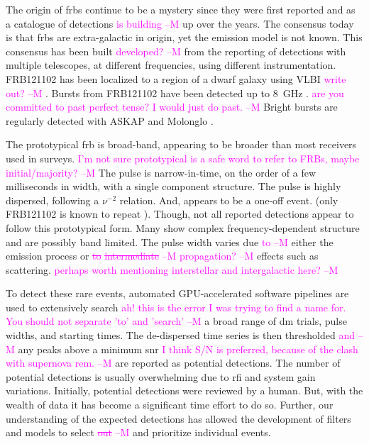 \documentclass[a4paper,fleqn,usenatbib]{mnras}
\newcommand{\cM}[1]{\textcolor{magenta}{ #1 --M}}
\begin{document}
The origin of \glspl{frb} continue to be a mystery since they were first
reported \citep{2007Sci...318..777L} and as a catalogue of detections \cM{is
building} up over the years.  The consensus today is that \glspl{frb} are
extra-galactic in origin, yet the emission model is not known.  This consensus
has been built \cM{developed?} from the reporting of detections with multiple telescopes, at
different frequencies, using different instrumentation.  FRB121102 has been
localized to a region of a dwarf galaxy using VLBI \cM{write out?}
\citep{2017ApJ...834L...7T,2017Natur.541...58C}.  Bursts from FRB121102 have
been detected up to 8~GHz \citep{atel10675}. \cM{are you committed to past perfect tense? I would just do past.} Bright bursts are regularly
detected with ASKAP and Molonglo
\citep{2017ApJ...841L..12B,2017MNRAS.468.3746C,atel10693}.

The prototypical \gls{frb} is broad-band, appearing to be broader than most
receivers used in surveys. \cM{I'm not sure prototypical is a safe word to refer to FRBs, maybe initial/majority?} The pulse is narrow-in-time, on the order of a few
milliseconds in width, with a single component structure. The pulse is highly
dispersed, following a $\nu^{-2}$ relation. And, appears to be a one-off event.
(only FRB121102 is known to repeat \citep{2016Natur.531..202S}).  Though, not
all reported detections appear to follow this prototypical form. Many show
complex frequency-dependent structure and are possibly band limited. The pulse
width varies due \cM{to} either the emission process or \cM{\sout{to} \sout{intermediate}} \cM{propagation?} effects such as
scattering. \cM{perhaps worth mentioning interstellar and intergalactic here?}

To detect these rare events, automated GPU-accelerated software pipelines are
used to extensively search \cM{ah! this is the error I was trying to find a name for. You should not separate 'to' and 'search'} a broad range of \gls{dm} trials, pulse widths, and
starting times. The de-dispersed time series is then thresholded \cM{and} any peaks
above a minimum \gls{snr} \cM{I think S/N is preferred, because of the clash with supernova rem.} are reported as potential detections. The number of
potential detections is usually overwhelming due to \gls{rfi} and system gain
variations. Initially, potential detections were reviewed by a human. But, with
the wealth of data it has become a significant time effort to do so. Further,
our understanding of the expected detections has allowed the development of
filters and models to select \cM{\sout{out}} and prioritize individual events.
\end{document}
